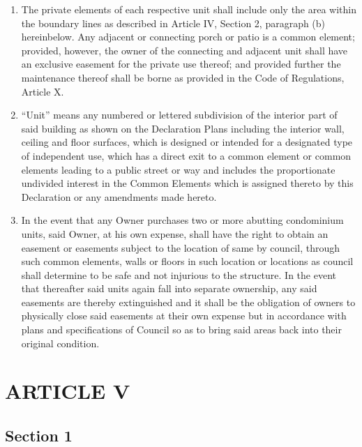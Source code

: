 \documentclass[
]{book}
\begin{document}
\begin{enumerate}
\def\labelenumi{(\alph{enumi})}
\item
  The private elements of each respective unit shall include only the area within the boundary lines as described in Article IV, Section 2, paragraph (b) hereinbelow. Any adjacent or connecting porch or patio is a common element; provided, however, the owner of the connecting and adjacent unit shall have an exclusive easement for the private use thereof; and provided further the maintenance thereof shall be borne as provided in the Code of Regulations, Article X.
\item
  ``Unit'' means any numbered or lettered subdivision of the interior part of said building as shown on the Declaration Plans including the interior wall, ceiling and floor surfaces, which is designed or intended for a designated type of independent use, which has a direct exit to a common element or common elements leading to a public street or way and includes the proportionate undivided interest in the Common Elements which is assigned thereto by this Declaration or any amendments made hereto.
\item
  In the event that any Owner purchases two or more abutting condominium units, said Owner, at his own expense, shall have the right to obtain an easement or easements subject to the location of same by council, through such common elements, walls or floors in such location or locations as council shall determine to be safe and not injurious to the structure. In the event that thereafter said units again fall into separate ownership, any said easements are thereby extinguished and it shall be the obligation of owners to physically close said easements at their own expense but in accordance with plans and specifications of Council so as to bring said areas back into their original condition.
\end{enumerate}

\hypertarget{article-v}{%
\section*{ARTICLE V}\label{article-v}}

\hypertarget{section-1-1}{%
\subsection*{Section 1}\label{section-1-1}}
\end{document}
